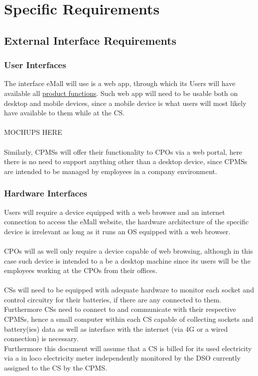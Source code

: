 \documentclass[11pt]{article}
\begin{document}
\section{Specific Requirements}
\label{section:specificRequirements}

\subsection{External Interface Requirements}

\subsubsection{User Interfaces}

The interface eMall will use is a web app, through which its Users will have available all \hyperref[subsec:prodfunctions]{product functions}. Such web app will need to be usable both on desktop and mobile devices, since a mobile device is what users will most likely have available to them while at the CS. \\
\\
MOCHUPS HERE \\
\\
Similarly, CPMSs will offer their functionality to CPOs via a web portal, here there is no need to support anything other than a desktop device, since CPMSs are intended to be managed by employees in a company environment.

\subsubsection{Hardware Interfaces}

Users will require a device equipped with a web browser and an internet connection to access the eMall website, the hardware architecture of the specific device is irrelevant as long as it runs an OS equipped with a web browser. \\
\\
CPOs will as well only require a device capable of web browsing, although in this case such device is intended to a be a desktop machine since its users will be the employees working at the CPOs from their offices. \\
\\
CSs will need to be equipped with adequate hardware to monitor each socket and control circuitry for their batteries, if there are any connected to them. Furthermore CSs need to connect to and communicate with their respective CPMSs, hence a small computer within each CS capable of collecting sockets and battery(ies) data as well as interface with the internet (via 4G or a wired connection) is necessary. \\
Furthermore this document will assume that a CS is billed for its used electricity via a in loco electricity meter independently monitored by the DSO currently assigned to the CS by the CPMS.
\end{document}
